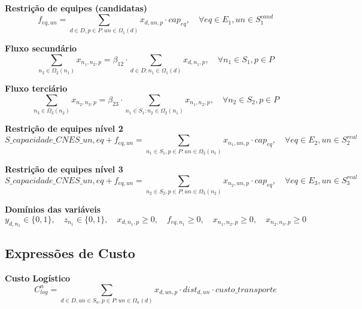 \documentclass{article}
\begin{document}
\textbf{Restrição de equipes (candidatas)}
\begin{equation}
f_{eq,un} = \sum_{d \in D, p \in P: un \in \Omega_1(d)} x_{d,un,p} \cdot cap_{eq}, \quad \forall eq \in E_1, un \in S_1^{cand} \tag{6}
\end{equation}

\textbf{Fluxo secundário}
\begin{equation}
\sum_{n_2 \in \Omega_2(n_1)} x_{n_1,n_2,p} = \beta_{12} \cdot \sum_{d \in D: n_1 \in \Omega_1(d)} x_{d,n_1,p}, \quad \forall n_1 \in S_1, p \in P \tag{7}
\end{equation}

\textbf{Fluxo terciário}
\begin{equation}
\sum_{n_3 \in \Omega_3(n_2)} x_{n_2,n_3,p} = \beta_{23} \cdot \sum_{n_1 \in S_1: n_2 \in \Omega_2(n_1)} x_{n_1,n_2,p}, \quad \forall n_2 \in S_2, p \in P \tag{8}
\end{equation}

\textbf{Restrição de equipes nível 2}
\begin{equation}
S\_capacidade\_CNES\_{un,eq} + f_{eq,un} = \sum_{n_1 \in S_1, p \in P: un \in \Omega_2(n_1)} x_{n_1,un,p} \cdot cap_{eq}, \quad \forall eq \in E_2, un \in S_2^{real} \tag{9}
\end{equation}

\textbf{Restrição de equipes nível 3}
\begin{equation}
S\_capacidade\_CNES\_{un,eq} + f_{eq,un} = \sum_{n_2 \in S_2, p \in P: un \in \Omega_3(n_2)} x_{n_2,un,p} \cdot cap_{eq}, \quad \forall eq \in E_3, un \in S_3^{real} \tag{10}
\end{equation}

\textbf{Domínios das variáveis}
\begin{equation}
y_{d,n_1} \in \{0,1\}, \quad z_{n_1} \in \{0,1\}, \quad x_{d,n_1,p} \geq 0, \quad f_{eq,n_1} \geq 0, \quad x_{n_1,n_2,p} \geq 0, \quad x_{n_2,n_3,p} \geq 0
\end{equation}

\subsection{Expressões de Custo}

\textbf{Custo Logístico}
\begin{equation}
C_{log}^n = \sum_{d \in D, un \in S_n, p \in P: un \in \Omega_n(d)} x_{d,un,p} \cdot dist_{d,un} \cdot custo\_transporte
\end{equation}
\end{document}
